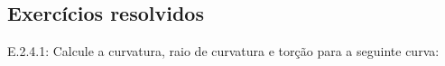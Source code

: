 \subsection*{Exercícios resolvidos}
E.2.4.1: Calcule a curvatura, raio de curvatura e torção para a seguinte curva:
